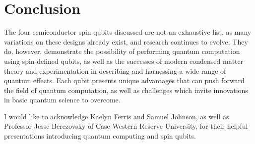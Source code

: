 \documentclass[aps,prl,twocolumn,superscriptaddress,groupedaddress]{revtex4}
\begin{document}
\section{Conclusion}
The four semiconductor spin qubits discussed are not an exhaustive list, as many variations on these designs already exist, and research continues to evolve. They do, however, demonstrate the possibility of performing quantum computation using spin-defined qubits, as well as the successes of modern condensed matter theory and experimentation in describing and harnessing a wide range of quantum effects. Each qubit presents unique advantages that can push forward the field of quantum computation, as well as challenges which invite innovations in basic quantum science to overcome.

\begin{thebibliography}{99}
I would like to acknowledge Kaelyn Ferris and Samuel Johnson, as well as Professor Jesse Berezovsky of Case Western Reserve University, for their helpful presentations introducing quantum computing and spin qubits.
\end{thebibliography}
{}
\end{document}
